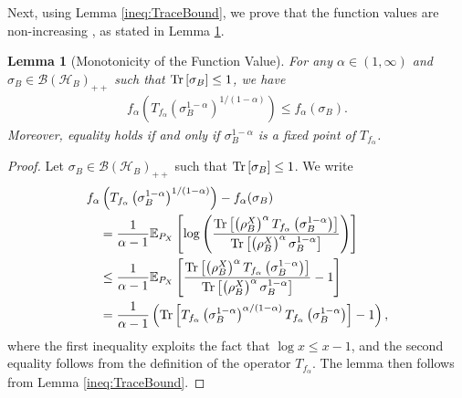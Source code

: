 \documentclass{article}
\newtheorem{lemma}[theorem]{Lemma}
\begin{document}
Next, using Lemma \ref{ineq:TraceBound}, we prove that the function values are non-increasing , as stated in Lemma \ref{ineq:FvalDecrease}.
\begin{lemma}[{Monotonicity of the Function Value}]
    \label{ineq:FvalDecrease}
    For any $\alpha\in(1,\infty)$ and $\sigma_B\in\mathcal{B}\left(\mathcal{H}_B\right)_{++}$ such that $\Tr\left[\sigma_B\right]\leq 1$, we have  
    \begin{align}
        f_{\alpha}\left(T_{f_{\alpha}}\left(\sigma_B^{1-\alpha}\right)^{1/(1-\alpha)}\right)
        \leq f_{\alpha}(\sigma_B).
    \end{align}
    Moreover, equality holds if and only if $\sigma_B^{1 - \alpha}$ is a fixed point of $T_{f_\alpha}$.
\end{lemma}
\begin{proof}
    Let $\sigma_B \in \mathcal{B}\left(\mathcal{H}_B\right)_{++}$ such that $\Tr\left[\sigma_B\right]\leq 1$. 
    We write
    \begin{align}
        &f_{\alpha}\left(T_{f_{\alpha}}\left(\sigma_B^{1-\alpha}\right)^{1/(1-\alpha)}\right)- f_{\alpha}(\sigma_B)\nonumber\\
        &\quad =\frac{1}{\alpha-1}\mathbb{E}_{P_X}\left[\log\left(\frac{ \Tr\left[ \left(\rho_B^X\right)^{\alpha}T_{f_{\alpha}}\left(\sigma_B^{1-\alpha}\right)\right]}{\Tr\left[ \left(\rho_B^X\right)^{\alpha}\sigma_B^{1-\alpha}\right]}\right)\right]\nonumber\\
        &\quad\leq\frac{1}{\alpha-1}\mathbb{E}_{P_X}\left[\frac{ \Tr\left[ \left(\rho_B^X\right)^{\alpha}T_{f_{\alpha}}\left(\sigma_B^{1-\alpha}\right)\right]}{\Tr\left[ \left(\rho_B^X\right)^{\alpha}\sigma_B^{1-\alpha}\right]}-1\right]\nonumber\\
        &\quad =\frac{1}{\alpha-1}\left(\Tr\left[T_{f_{\alpha}}\left(\sigma_B^{1-\alpha}\right)^{\alpha/(1-\alpha)}T_{f_{\alpha}}\left(\sigma_B^{1-\alpha}\right)\right]-1\right),\nonumber %
    \end{align}
    where the first inequality exploits the fact that $\log x \leq x - 1$, 
    and 
    the second equality follows from the definition of the operator $T_{f_{\alpha}}$.
    The lemma then follows from Lemma \ref{ineq:TraceBound}. 
\end{proof}
\end{document}
